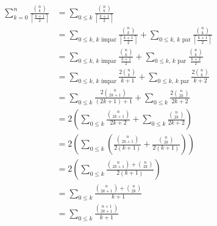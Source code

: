 \documentclass{article}
\newcommand{\techo}[1]{\left \lceil #1 \right \rceil}
\begin{document}
\begin{enumerate}[a.]
\begin{align*}
\sum_{k=0}^n \frac{\binom{n}{k}}{\techo{\frac{k+1}{2}}} & = \sum_{0 \leq k} \frac{\binom{n}{k}}{\techo{\frac{k+1}{2}}} \\
  & = \sum_{0 \leq k\text{, } k \text{ impar}} \frac{\binom{n}{k}}{\techo{\frac{k+1}{2}}} +
      \sum_{0 \leq k\text{, } k \text{ par}} \frac{\binom{n}{k}}{\techo{\frac{k+1}{2}}} \\
  & = \sum_{0 \leq k\text{, } k \text{ impar}} \frac{\binom{n}{k}}{\frac{k+1}{2}} +
      \sum_{0 \leq k\text{, } k \text{ par}} \frac{\binom{n}{k}}{\frac{k+2}{2}} \\
  & = \sum_{0 \leq k\text{, } k \text{ impar}} \frac{2 \binom{n}{k}}{k+1} +
      \sum_{0 \leq k\text{, } k \text{ par}} \frac{2 \binom{n}{k}}{k+2} \\
  & = \sum_{0 \leq k} \frac{2 \binom{n}{2k+1}}{(2k+1)+1} +
      \sum_{0 \leq k} \frac{2 \binom{n}{2k}}{2k+2} \\
  & = 2 \left( \sum_{0 \leq k} \frac{\binom{n}{2k+1}}{2k+2} +
      \sum_{0 \leq k} \frac{\binom{n}{2k}}{2k+2} \right) \\
  & = 2 \left( \sum_{0 \leq k} \left( \frac{\binom{n}{2k+1}}{2(k+1)} + \frac{\binom{n}{2k}}{2(k+1)} \right) \right) \\
  & = 2 \left( \sum_{0 \leq k} \frac{\binom{n}{2k+1}+\binom{n}{2k}}{2(k+1)} \right) \\
  & = \sum_{0 \leq k} \frac{\binom{n}{2k+1}+\binom{n}{2k}}{k+1} \\
  & = \sum_{0 \leq k} \frac{\binom{n+1}{2k+1}}{k+1} \\
\end{align*}

\end{enumerate}

\section{}

\section{}
\end{document}
